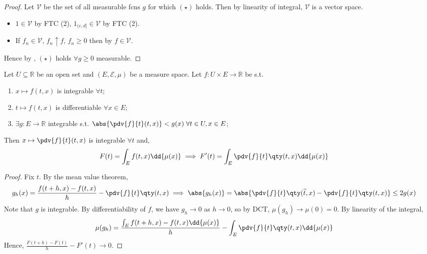 \begin{proof}
	Let $\mathcal{V}$ be the set of all measurable fcns $g$ for which $(\star)$ holds.
	Then by linearity of integral, $\mathcal{V}$ is a vector space.
	\begin{itemize}
		\item $1 \in \mathcal{V}$ by FTC (2), $1_{(c, d]} \in \mathcal{V}$ by FTC (2).
		\item If $f_n \in \mathcal{V}$, $f_n \uparrow f$, $f_n \geq 0$ then by  $f \in \mathcal{V}$.
	\end{itemize}
	Hence by , $(\star)$ holds $\forall g \geq 0$ measurable.
\end{proof}

\begin{theorem}
	Let $U \subseteq \mathbb R$ be an open set and $(E, \mathcal E, \mu)$ be a measure space.
	Let $f \colon U \times E \to \mathbb R$ be s.t.
	\begin{enumerate}
		\item $x \mapsto f(t, x)$ is integrable $\forall t$;
		\item $t \mapsto f(t,x)$ is differentiable $\forall x \in E$;
		\item $\exists g : E \to \mathbb{R}$ integrable s.t. $\abs{\pdv{f}{t}(t, x)} < g(x) \; \forall t \in U, x \in E$;
	\end{enumerate}
	Then $x \mapsto \pdv{f}{t}(t, x)$ is integrable $\forall t$ and,
	\[ F(t) = \int_E f(t,x) \dd{\mu(x)} \implies F'(t) = \int_E \pdv{f}{t}\qty(t,x) \dd{\mu(x)} \]
\end{theorem}

\begin{proof}
	Fix $t$.
	By the mean value theorem,
	\[ g_h(x) = \frac{f(t + h, x) - f(t, x)}{h} - \pdv{f}{t}\qty(t,x) \implies \abs{g_h(x)} = \abs{\pdv{f}{t}\qty(\widetilde t, x) - \pdv{f}{t}\qty(t, x)} \leq 2g(x) \]
	Note that $g$ is integrable.
	By differentiability of $f$, we have $g_h \to 0$ as $h \to 0$, so by DCT, $\mu(g_h) \to \mu(0) = 0$.
	By linearity of the integral,
	\[ \mu(g_h) = \frac{\int_E f(t + h, x) - f(t, x) \dd{\mu(x)}}{h} - \int_E \pdv{f}{t}\qty(t,x) \dd{\mu(x)} \]
	Hence, $\frac{F(t+h) - F(t)}{h} - F'(t) \to 0$.
\end{proof}

